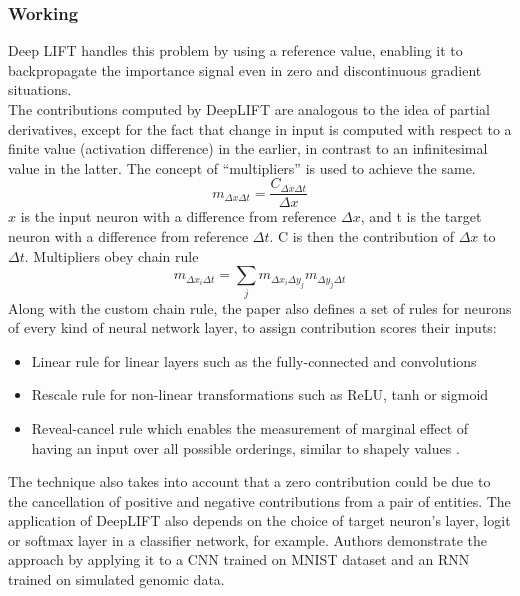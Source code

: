 \documentclass[../report.tex]{subfiles}
\begin{document}
 \subsubsection*{Working}
 Deep LIFT handles this problem by using a reference value, enabling it to backpropagate the importance signal even in zero and discontinuous gradient situations.\\
 The contributions computed by DeepLIFT are analogous to the idea of partial derivatives, except for the fact that change in input is computed with respect to a finite value (activation difference) in the earlier, in contrast to an infinitesimal value in the latter. The concept of \enquote{multipliers} is used to achieve the same.
\begin{equation*}
		m_{\Delta x \Delta t} = \frac{C_{\Delta x \Delta t}}{\Delta x}
\end{equation*}
 $x$ is the input neuron with a difference from reference $\Delta x$, and t is the target neuron with a difference from reference $\Delta t$. C is then the contribution of $\Delta x$ to $\Delta t$.
 Multipliers obey chain rule
\begin{equation*}
	m_{\Delta x_i \Delta t}=\sum_j m_{\Delta x_i \Delta y_j} m_{\Delta y_j \Delta t}
\end{equation*}
 Along with the custom chain rule, the paper also defines a set of rules for neurons of every kind of neural network layer, to assign contribution scores their inputs:
 \begin{itemize}
 	\item Linear rule for linear layers such as the fully-connected and convolutions
 	\item Rescale rule for non-linear transformations such as ReLU, tanh or sigmoid
 	\item Reveal-cancel rule which enables the measurement of marginal effect of having an input over all possible orderings, similar to shapely values \cite{shapley_values}. 
 \end{itemize}

The technique also takes into account that a zero contribution could be due to the cancellation of positive and negative contributions from a pair of entities. The application of DeepLIFT also depends on the choice of target neuron’s layer, logit or softmax layer in a classifier network, for example. Authors demonstrate the approach by applying it to a CNN trained on MNIST dataset \cite{lecun1998gradient} and an RNN trained on simulated genomic data.
\end{document}
